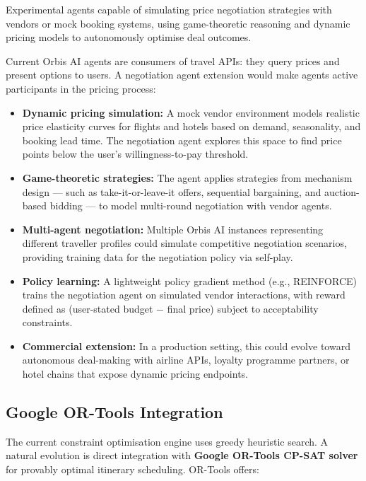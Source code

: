 \documentclass[12pt, a4paper]{article}
\begin{document}
\begin{highlightbox}
Experimental agents capable of simulating price negotiation strategies with vendors or mock booking systems, using game-theoretic reasoning and dynamic pricing models to autonomously optimise deal outcomes.
\end{highlightbox}

Current Orbis AI agents are consumers of travel APIs: they query prices and present options to users. A negotiation agent extension would make agents active participants in the pricing process:

\begin{itemize}[leftmargin=1.5cm, itemsep=0.4em]
  \item \textbf{Dynamic pricing simulation:} A mock vendor environment models realistic price elasticity curves for flights and hotels based on demand, seasonality, and booking lead time. The negotiation agent explores this space to find price points below the user's willingness-to-pay threshold.
  \item \textbf{Game-theoretic strategies:} The agent applies strategies from mechanism design --- such as take-it-or-leave-it offers, sequential bargaining, and auction-based bidding --- to model multi-round negotiation with vendor agents.
  \item \textbf{Multi-agent negotiation:} Multiple Orbis AI instances representing different traveller profiles could simulate competitive negotiation scenarios, providing training data for the negotiation policy via self-play.
  \item \textbf{Policy learning:} A lightweight policy gradient method (e.g., REINFORCE) trains the negotiation agent on simulated vendor interactions, with reward defined as (user-stated budget $-$ final price) subject to acceptability constraints.
  \item \textbf{Commercial extension:} In a production setting, this could evolve toward autonomous deal-making with airline APIs, loyalty programme partners, or hotel chains that expose dynamic pricing endpoints.
\end{itemize}

\subsection{Google OR-Tools Integration}

The current constraint optimisation engine uses greedy heuristic search. A natural evolution is direct integration with \textbf{Google OR-Tools CP-SAT solver} for provably optimal itinerary scheduling. OR-Tools offers:
\end{document}
